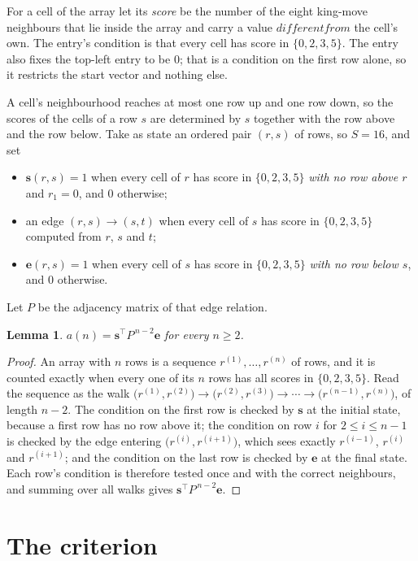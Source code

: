 \documentclass[11pt,a4paper]{article}
\theoremstyle{plain}
\newtheorem{lemma}[theorem]{Lemma}
\theoremstyle{definition}
\begin{document}
For a cell of the array let its \emph{score} be the number of the eight king-move neighbours that lie inside
the array and carry a value $different from$ the cell's own. The entry's condition is that every cell
has score in $\{0,2,3,5\}$. The entry also fixes the top-left entry to be $0$; that is a condition on the first row alone, so it restricts the start vector and nothing else.

A cell's neighbourhood reaches at most one row up and one row down, so the scores of the
cells of a row $s$ are determined by $s$ together with the row above and the row below.
Take as state an ordered pair $(r,s)$ of rows, so $S=16$, and set
\begin{itemize}
\item $\mathbf{s}(r,s)=1$ when every cell of $r$ has score in $\{0,2,3,5\}$ \emph{with no row
above $r$} and $r_1=0$, and $0$ otherwise;
\item an edge $(r,s)\to(s,t)$ when every cell of $s$ has score in $\{0,2,3,5\}$ computed from
$r$, $s$ and $t$;
\item $\mathbf{e}(r,s)=1$ when every cell of $s$ has score in $\{0,2,3,5\}$ \emph{with no row
below $s$}, and $0$ otherwise.
\end{itemize}
Let $P$ be the adjacency matrix of that edge relation.

\begin{lemma}\label{lem:walk}
$a(n)=\mathbf{s}^{\!\top}P^{\,n-2}\mathbf{e}$ for every $n\ge2$.
\end{lemma}

\begin{proof}
An array with $n$ rows is a sequence $r^{(1)},\dots,r^{(n)}$ of rows, and it is counted
exactly when every one of its $n$ rows has all scores in $\{0,2,3,5\}$. Read the sequence as the
walk $\bigl(r^{(1)},r^{(2)}\bigr)\to\bigl(r^{(2)},r^{(3)}\bigr)\to\cdots\to
\bigl(r^{(n-1)},r^{(n)}\bigr)$, of length $n-2$. The condition on the first row is
checked by $\mathbf{s}$ at the initial state, because a first row has no row above it; the
condition on row $i$ for $2\le i\le n-1$ is checked by the edge entering
$\bigl(r^{(i)},r^{(i+1)}\bigr)$, which sees exactly $r^{(i-1)}$, $r^{(i)}$ and
$r^{(i+1)}$; and the condition on the last row is checked by $\mathbf{e}$ at the final
state. Each row's condition is therefore tested once and with the correct neighbours, and
summing over all walks gives $\mathbf{s}^{\!\top}P^{\,n-2}\mathbf{e}$.
\end{proof}

\section{The criterion}
\end{document}
